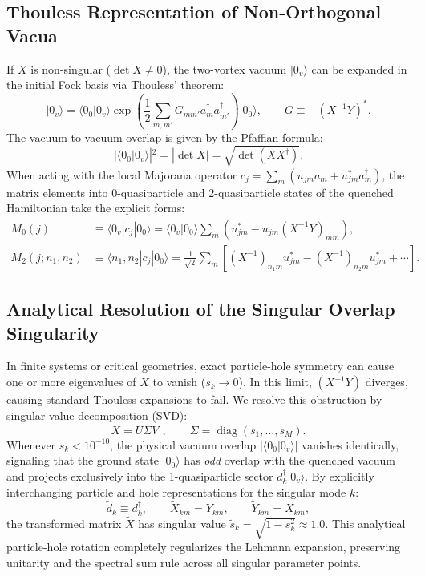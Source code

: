 \subsection{Thouless Representation of Non-Orthogonal Vacua}
If $X$ is non-singular ($\det X \neq 0$), the two-vortex vacuum $|0_v\rangle$ can be expanded in the initial Fock basis via Thouless' theorem:
\begin{equation}
\label{eq:p3_thouless_theorem}
|0_v\rangle = \langle 0_0 | 0_v \rangle \exp \left( \frac{1}{2} \sum_{m, m'} G_{m m'} a_m^\dagger a_{m'}^\dagger \right) |0_0\rangle, \qquad G \equiv - (X^{-1} Y)^*.
\end{equation}
The vacuum-to-vacuum overlap is given by the Pfaffian formula:
\begin{equation}
|\langle 0_0 | 0_v \rangle|^2 = |\det X| = \sqrt{\det (X X^\dagger)}.
\end{equation}
When acting with the local Majorana operator $c_j = \sum_m (u_{jm} a_m + u_{jm}^* a_m^\dagger)$, the matrix elements into $0$-quasiparticle and $2$-quasiparticle states of the quenched Hamiltonian take the explicit forms:
\begin{align}
M_0(j) &\equiv \langle 0_v | c_j | 0_0 \rangle = \langle 0_v | 0_0 \rangle \sum_m \left( u_{jm}^* - u_{jm} (X^{-1} Y)_{mm} \right), \\
M_2(j; n_1, n_2) &\equiv \langle n_1, n_2 | c_j | 0_0 \rangle = \frac{1}{\sqrt{2}} \sum_m \left[ (X^{-1})_{n_1 m} u_{jm}^* - (X^{-1})_{n_2 m} u_{jm}^* + \cdots \right].
\end{align}

\subsection{Analytical Resolution of the Singular Overlap Singularity}
In finite systems or critical geometries, exact particle-hole symmetry can cause one or more eigenvalues of $X$ to vanish ($s_k \to 0$). In this limit, $(X^{-1} Y)$ diverges, causing standard Thouless expansions to fail. 
We resolve this obstruction by singular value decomposition (SVD):
\begin{equation}
X = U \Sigma V^\dagger, \qquad \Sigma = \operatorname{diag}(s_1, \dots, s_M).
\end{equation}
Whenever $s_k < 10^{-10}$, the physical vacuum overlap $|\langle 0_0 | 0_v \rangle|$ vanishes identically, signaling that the ground state $|0_0\rangle$ has \emph{odd} overlap with the quenched vacuum and projects exclusively into the 1-quasiparticle sector $d_k^\dagger |0_v\rangle$. By explicitly interchanging particle and hole representations for the singular mode $k$:
\begin{equation}
\tilde{d}_k \equiv d_k^\dagger, \qquad \tilde{X}_{km} = Y_{km}, \qquad \tilde{Y}_{km} = X_{km},
\end{equation}
the transformed matrix $\tilde{X}$ has singular value $\tilde{s}_k = \sqrt{1 - s_k^2} \approx 1.0$. This analytical particle-hole rotation completely regularizes the Lehmann expansion, preserving unitarity and the spectral sum rule across all singular parameter points.

